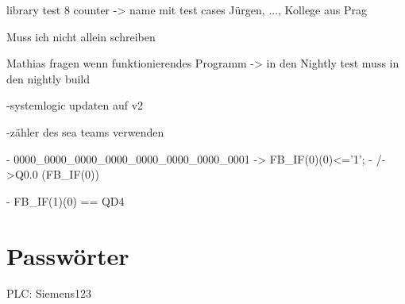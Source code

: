 library test 8 counter -> name mit test cases Jürgen, ..., Kollege aus Prag

Muss ich nicht allein schreiben

Mathias fragen wenn funktionierendes Programm -> in den Nightly test muss in den nightly build

-systemlogic updaten auf v2 

-zähler des sea teams verwenden

- 0000\_0000\_0000\_0000\_0000\_0000\_0000\_0001 -> FB\_IF(0)(0)<='1';
-    /->Q0.0                          (FB\_IF(0))

- FB\_IF(1)(0) == QD4
\chapter{Passwörter}

PLC: Siemens123